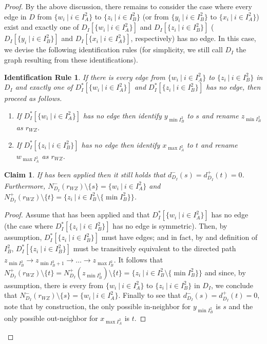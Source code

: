 \documentclass[a4paper,11pt]{article}
\theoremstyle{plain}
\newtheorem{claim}[theorem]{Claim}
\newtheorem{identification rule}{Identification Rule}
\theoremstyle{definition}
\theoremstyle{remark}
\newenvironment{claimproof}{\begin{proof}\renewcommand{\qedsymbol}{\claimqed}}{\end{proof}\renewcommand{\qedsymbol}{\plainqed}}
\let\plainqed\qedsymbol
\newcommand{\claimqed}{$\lrcorner$}
\begin{document}
\begin{proof}
By the above discussion, there remains to consider the case where every edge in $D$ from $\{w_i~|~i \in I_A^2\}$ to $\{z_i~|~i \in I_B^2\}$ (or from $\{y_i~|~i\in I_B^2\}$ to $\{x_i~|~i \in I_A^2\}$) exist and exactly one of $D_I[\{w_i~|~i \in I_A^2\}]$ and $D_I[\{z_i~|~i \in I_B^2\}]$ ($D_I[\{y_i~|~i\in I_B^2\}]$ and $D_I[\{x_i~|~i \in I_A^2\}]$, respectively) has no edge. In this case, we devise the following identification rules (for simplicity, we still call $D_I$ the graph resulting from these identifications).

\begin{identification rule}
\label{rr:WZ}
If there is every edge from $\{w_i~|~i \in I_A^2\}$ to $\{z_i~|~i \in I_B^2\}$ in $D_I$ 
and exactly one of $D_I^*[\{w_i~|~i \in I_A^2\}]$ and $D_I^*[\{z_i~|~i \in I_B^2\}]$ has no edge, then proceed as follows.
\begin{enumerate}[nosep]
\item If $D_I^*[\{w_i~|~i \in I_A^2\}]$ has no edge then identify $y_{\min I_B^2}$ to $s$ and
rename $z_{\min I_B^2}$ as $r_{WZ}$.
\item If $D_I^*[\{z_i~|~i \in I_B^2\}]$ has no edge then identify $x_{\max I_A^2}$ to $t$ and
rename $w_{\max I_A^2}$ as $r_{WZ}$.
\end{enumerate}
\end{identification rule}

\begin{claim}
\label{clm:renamingWZ}
If  has been applied then it still holds that $d^-_{D_I}(s) = d^+_{D_I}(t) = 0$.
Furthermore, $N^-_{D_I}(r_{WZ}) \setminus \{s\} = \{w_i~|~i \in I_A^2\}$ and $N^+_{D_I}(r_{WZ}) \setminus \{t\} = \{z_i~|~i \in I_B^2 \setminus \{\min I_B^2\}\}$.
\end{claim}

\begin{claimproof}
Assume that  has been applied and that $D_I^*[\{w_i~|~i \in I_A^2\}]$ has no edge (the case where $D_I^*[\{z_i~|~i \in I_B^2\}]$ has no edge is symmetric).
Then, by assumption, $D_I^*[\{z_i~|~i \in I_B^2\}]$ must have edges;
and in fact, by  and definition of $I_B^2$, 
$D_I^*[\{z_i~|~i \in I_B^2\}]$ must be transitively equivalent to the directed path 
$z_{\min I_B^2} \rightarrow z_{\min I_B^2 +1} \rightarrow \ldots \rightarrow z_{\max I_B^2}$.
It follows that $N^+_{D_I}(r_{WZ}) \setminus \{t\} = N^+_{D_I}(z_{\min I_B^2}) \setminus \{t\} = \{z_i~|~i \in I_B^2 \setminus \{\min I_B^2\}\}$
and since, by assumption, there is every from $\{w_i~|~i \in I_A^2\}$ to $\{z_i~|~i \in I_B^2\}$ in $D_I$,
we conclude that $N^-_{D_I}(r_{WZ}) \setminus \{s\} = \{w_i~|~i \in I_A^2\}$.
Finally to see that $d^-_{D_I}(s) = d^+_{D_I}(t) = 0$, note that by construction, the only possible in-neighbor for $y_{\min I_B^2}$ is $s$ and the only possible out-neighbor for $x_{\max I_A^2}$ is $t$.
\end{claimproof}


\end{proof}
\end{document}
